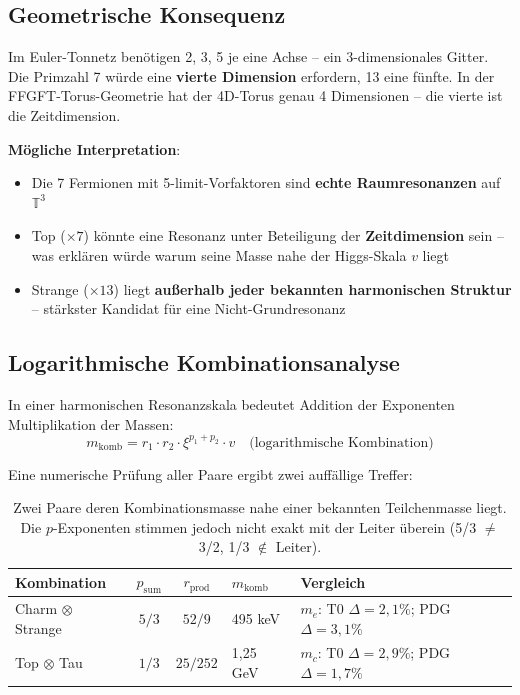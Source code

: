 \subsection{Geometrische Konsequenz}

Im Euler-Tonnetz benötigen 2, 3, 5 je eine Achse -- ein
3-dimensionales Gitter. Die Primzahl 7 würde eine
\textbf{vierte Dimension} erfordern, 13 eine fünfte. In der
FFGFT-Torus-Geometrie hat der 4D-Torus genau 4 Dimensionen --
die vierte ist die Zeitdimension.

\textbf{Mögliche Interpretation}:
\begin{itemize}
    \item Die 7 Fermionen mit 5-limit-Vorfaktoren sind
          \textbf{echte Raumresonanzen} auf $\mathbb{T}^3$
    \item Top ($\times 7$) könnte eine Resonanz unter Beteiligung
          der \textbf{Zeitdimension} sein -- was erklären würde
          warum seine Masse nahe der Higgs-Skala $v$ liegt
    \item Strange ($\times 13$) liegt \textbf{außerhalb jeder
          bekannten harmonischen Struktur} -- stärkster Kandidat
          für eine Nicht-Grundresonanz
\end{itemize}

\subsection{Logarithmische Kombinationsanalyse}

In einer harmonischen Resonanzskala bedeutet Addition der Exponenten
Multiplikation der Massen:
\begin{equation}
    m_{\text{komb}} = r_1 \cdot r_2 \cdot \xi^{p_1+p_2} \cdot v
    \quad \text{(logarithmische Kombination)}
\end{equation}

Eine numerische Prüfung aller Paare ergibt zwei auffällige Treffer:

\begin{table}[htbp]
\centering\footnotesize
\begin{tabular}{lccll}
\toprule
\textbf{Kombination} & $p_{\text{sum}}$ & $r_{\text{prod}}$ & $m_{\text{komb}}$ & \textbf{Vergleich} \\
\midrule
Charm $\otimes$ Strange & $5/3$ & $52/9$ & 495 keV & $m_e$: T0 $\Delta{=}2{,}1\%$; PDG $\Delta{=}3{,}1\%$ \\
Top $\otimes$ Tau       & $1/3$ & $25/252$ & 1{,}25 GeV & $m_c$: T0 $\Delta{=}2{,}9\%$; PDG $\Delta{=}1{,}7\%$ \\
\bottomrule
\end{tabular}
\caption{Zwei Paare deren Kombinationsmasse nahe einer bekannten
Teilchenmasse liegt. Die $p$-Exponenten stimmen jedoch nicht exakt
mit der Leiter überein (5/3 $\neq$ 3/2, 1/3 $\notin$ Leiter).}
\label{tab:kombination}
\end{table}

